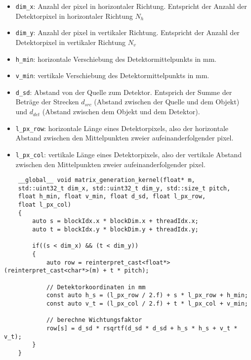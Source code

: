 \begin{itemize}
    \item \texttt{dim\_x}: Anzahl der \gls{pixel} in horizontaler Richtung. Entspricht der Anzahl der Detektorpixel in
          horizontaler Richtung $N_h$
    \item \texttt{dim\_y}: Anzahl der \gls{pixel} in vertikaler Richtung. Entspricht der Anzahl der Detektorpixel in
          vertikaler Richtung $N_v$
    \item \texttt{h\_min}: horizontale Verschiebung des Detektormittelpunkts in mm.
    \item \texttt{v\_min}: vertikale Verschiebung des Detektormittelpunkts in mm.
    \item \texttt{d\_sd}: Abstand von der Quelle zum Detektor. Entsprich der Summe der Beträge der Strecken $d_{src}$
          (Abstand zwischen der Quelle und dem Objekt) und $d_{det}$ (Abstand zwischen dem Objekt und dem Detektor).
    \item \texttt{l\_px\_row}: horizontale Länge eines Detektorpixels, also der horizontale Abstand zwischen den
          Mittelpunkten zweier aufeinanderfolgender \gls{pixel}.
    \item \texttt{l\_px\_col}: vertikale Länge eines Detektorpixels, also der vertikale Abstand zwischen den
          Mittelpunkten zweier aufeinanderfolgender \gls{pixel}.
\end{itemize}

\begin{code}
\begin{verbatim}
    __global__ void matrix_generation_kernel(float* m,
    std::uint32_t dim_x, std::uint32_t dim_y, std::size_t pitch,
    float h_min, float v_min, float d_sd, float l_px_row,
    float l_px_col)
    {
        auto s = blockIdx.x * blockDim.x + threadIdx.x;
        auto t = blockIdx.y * blockDim.y + threadIdx.y;

        if((s < dim_x) && (t < dim_y))
        {
            auto row = reinterpret_cast<float*>(reinterpret_cast<char*>(m) + t * pitch);

            // Detektorkoordinaten in mm
            const auto h_s = (l_px_row / 2.f) + s * l_px_row + h_min;
            const auto v_t = (l_px_col / 2.f) + t * l_px_col + v_min;

            // berechne Wichtungsfaktor
            row[s] = d_sd * rsqrtf(d_sd * d_sd + h_s * h_s + v_t * v_t);
        }
    }
\end{verbatim}
\label{source:impl_gen_mat}
\end{code}

